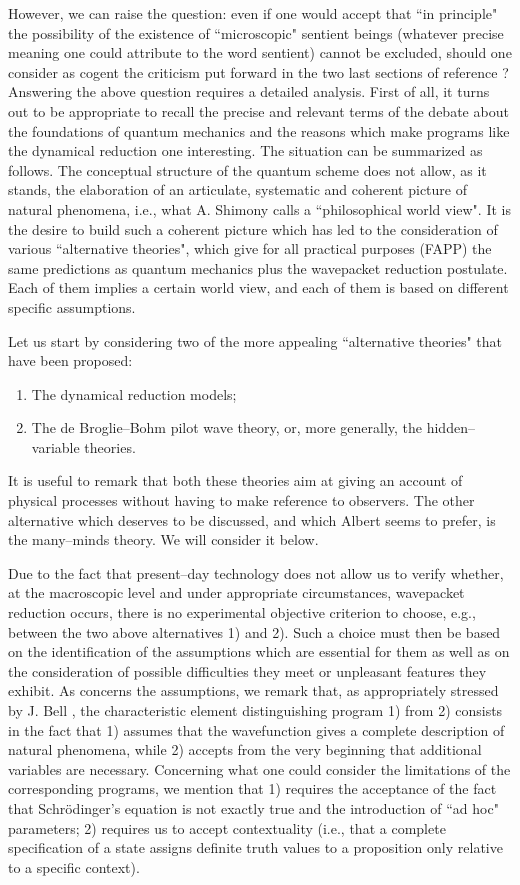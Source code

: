 \documentclass[10pt,a4paper]{article}
\begin{document}
However, we can raise the question: even if one would accept that
``in principle" the possibility of the existence of ``microscopic"
sentient beings (whatever precise meaning one could attribute to
the word sentient) cannot be excluded, should one consider as
cogent the criticism put forward in the two last sections of
reference \cite{ap}? Answering the above question requires a
detailed analysis. First of all, it turns out to be appropriate to
recall the precise and relevant terms of the debate about the
foundations of quantum mechanics and the reasons which make
programs like the dynamical reduction one interesting. The
situation can be summarized as follows. The conceptual structure
of the quantum scheme does not allow, as it stands, the
elaboration of an articulate, systematic and coherent picture of
natural phenomena, i.e., what A. Shimony \cite{shipcqf} calls a
``philosophical world view". It is the desire to build such a
coherent picture which has led to the consideration of various
``alternative theories", which give for all practical purposes
(FAPP) the same predictions as quantum mechanics plus the
wavepacket reduction postulate. Each of them implies a certain
world view, and each of them is based on different specific
assumptions.

Let us start by considering two of the more appealing
``alternative theories" that have been proposed:
\begin{enumerate}
\item The dynamical reduction models;
\item The de Broglie--Bohm pilot wave theory, or, more generally,
the hidden--variable theories.
\end{enumerate}

It is useful to remark that both these theories aim at giving an
account of physical processes without having to make reference to
observers. The other alternative which deserves to be discussed,
and which Albert seems to prefer, is the many--minds theory. We
will consider it below.

Due to the fact that present--day technology does not allow us to
verify whether, at the macroscopic level and under appropriate
circumstances, wavepacket reduction occurs, there is no
experimental objective criterion to choose, e.g., between the two
above alternatives 1) and 2). Such a choice must then be based on
the identification of the assumptions which are essential for them
as well as on the consideration of possible difficulties they meet
or unpleasant features they exhibit. As concerns the assumptions,
we remark that, as appropriately stressed by J. Bell
\cite{bellam}, the characteristic element distinguishing program
1) from 2) consists in the fact that 1) assumes that the
wavefunction gives a complete description of natural phenomena,
while 2) accepts from the very beginning that additional variables
are necessary. Concerning what one could consider the limitations
of the corresponding programs, we mention that 1) requires the
acceptance of the fact that Schr\"odinger's equation is not
exactly true and the introduction of ``ad hoc" parameters; 2)
requires us to accept contextuality (i.e., that a complete
specification of a state assigns definite truth values to a
proposition only relative to a specific context).
\end{document}
